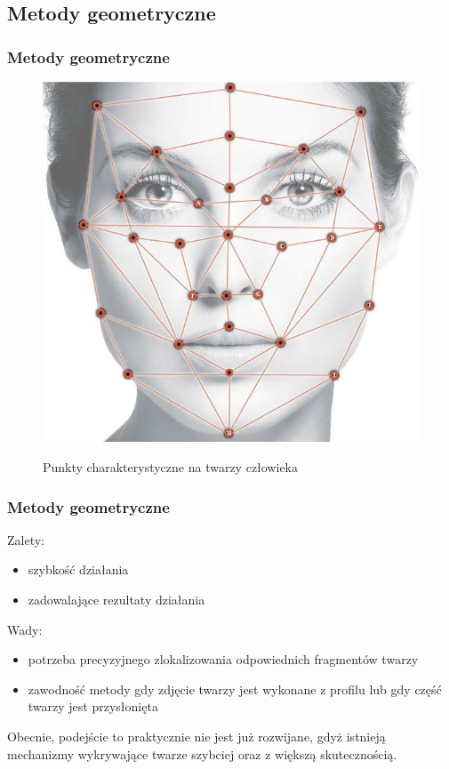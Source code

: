 \documentclass[xcolor=table]{beamer}
\begin{document}
\subsection{Metody geometryczne}
\begin{frame}
  \frametitle{Metody geometryczne}

\begin{figure}
  {\includegraphics[scale=0.3]{face_map.jpg}}
\caption{Punkty charakterystyczne na twarzy człowieka}
\end{figure}

\end{frame}

\begin{frame}
  \frametitle{Metody geometryczne}
 
Zalety:
\begin{itemize}
\item szybkość działania
\item zadowalające rezultaty działania
\end{itemize}

\vspace{10pt}
 {
Wady:
\begin{itemize}
\item potrzeba precyzyjnego zlokalizowania odpowiednich fragmentów twarzy
\item zawodność metody gdy zdjęcie twarzy jest wykonane z profilu lub gdy część twarzy jest przysłonięta
\end{itemize}}

\vspace{10pt}
 {
Obecnie, podejście to praktycznie nie jest już rozwijane, gdyż istnieją mechanizmy wykrywające twarze szybciej oraz z większą skutecznością.}

\end{frame}
\end{document}
